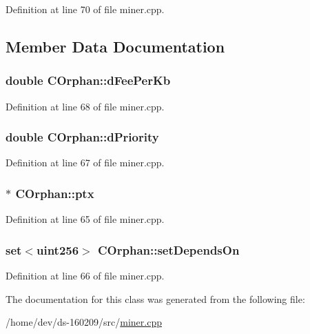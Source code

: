 Definition at line 70 of file miner.\+cpp.



\subsection{Member Data Documentation}
\hypertarget{class_c_orphan_a4a0f70b5609ceee00be532fd2116587e}{}
\subsubsection[{d\+Fee\+Per\+Kb}]{\setlength{\rightskip}{0pt plus 5cm}double C\+Orphan\+::d\+Fee\+Per\+Kb}\label{class_c_orphan_a4a0f70b5609ceee00be532fd2116587e}


Definition at line 68 of file miner.\+cpp.

\hypertarget{class_c_orphan_a899f7928b6d4e9206ce04d5b2953da33}{}
\subsubsection[{d\+Priority}]{\setlength{\rightskip}{0pt plus 5cm}double C\+Orphan\+::d\+Priority}\label{class_c_orphan_a899f7928b6d4e9206ce04d5b2953da33}


Definition at line 67 of file miner.\+cpp.

\hypertarget{class_c_orphan_ab00c8b3205357cd0c59545fefde0f1ae}{}
\subsubsection[{ptx}]{$\ast$ C\+Orphan\+::ptx}\label{class_c_orphan_ab00c8b3205357cd0c59545fefde0f1ae}


Definition at line 65 of file miner.\+cpp.

\hypertarget{class_c_orphan_a1b19183565d42c20ded09a2cc787fc50}{}
\subsubsection[{set\+Depends\+On}]{\setlength{\rightskip}{0pt plus 5cm}set$<${\bf uint256}$>$ C\+Orphan\+::set\+Depends\+On}\label{class_c_orphan_a1b19183565d42c20ded09a2cc787fc50}


Definition at line 66 of file miner.\+cpp.



The documentation for this class was generated from the following file\+:\begin{DoxyCompactItemize}
\item 
/home/dev/ds-\/160209/src/\hyperlink{miner_8cpp}{miner.\+cpp}\end{DoxyCompactItemize}
